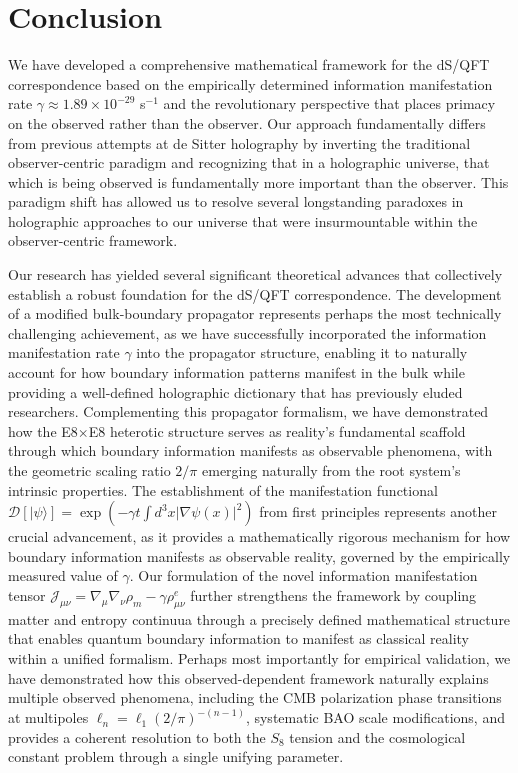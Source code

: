 \documentclass[11pt,english,twoside]{article}
\theoremstyle{plain}
\theoremstyle{definition}
\theoremstyle{remark}
\newcommand{\D}{{\mathcal{D}}}
\newcommand{\J}{{\mathcal{J}}}
\newcommand{\gammaR}{\gamma}
\begin{document}
\section{Conclusion}
\label{sec:conclusion}

We have developed a comprehensive mathematical framework for the dS/QFT correspondence based on the empirically determined information manifestation rate $\gammaR \approx 1.89 \times 10^{-29}$ s$^{-1}$ and the revolutionary perspective that places primacy on the observed rather than the observer. Our approach fundamentally differs from previous attempts at de Sitter holography by inverting the traditional observer-centric paradigm and recognizing that in a holographic universe, that which is being observed is fundamentally more important than the observer. This paradigm shift has allowed us to resolve several longstanding paradoxes in holographic approaches to our universe that were insurmountable within the observer-centric framework.

Our research has yielded several significant theoretical advances that collectively establish a robust foundation for the dS/QFT correspondence. The development of a modified bulk-boundary propagator represents perhaps the most technically challenging achievement, as we have successfully incorporated the information manifestation rate $\gammaR$ into the propagator structure, enabling it to naturally account for how boundary information patterns manifest in the bulk while providing a well-defined holographic dictionary that has previously eluded researchers. Complementing this propagator formalism, we have demonstrated how the E8$\times$E8 heterotic structure serves as reality's fundamental scaffold through which boundary information manifests as observable phenomena, with the geometric scaling ratio $2/\pi$ emerging naturally from the root system's intrinsic properties. The establishment of the manifestation functional $\D[|\psi\rangle] = \exp(-\gammaR t\int d^3x |\nabla\psi(x)|^2)$ from first principles represents another crucial advancement, as it provides a mathematically rigorous mechanism for how boundary information manifests as observable reality, governed by the empirically measured value of $\gammaR$. Our formulation of the novel information manifestation tensor $\J_{\mu\nu} = \nabla_{\mu}\nabla_{\nu}\rho_m - \gammaR\rho_{\mu\nu}^e$ further strengthens the framework by coupling matter and entropy continuua through a precisely defined mathematical structure that enables quantum boundary information to manifest as classical reality within a unified formalism. Perhaps most importantly for empirical validation, we have demonstrated how this observed-dependent framework naturally explains multiple observed phenomena, including the CMB polarization phase transitions at multipoles $\ell_n = \ell_1(2/\pi)^{-(n-1)}$, systematic BAO scale modifications, and provides a coherent resolution to both the $S_8$ tension and the cosmological constant problem through a single unifying parameter.
\end{document}
